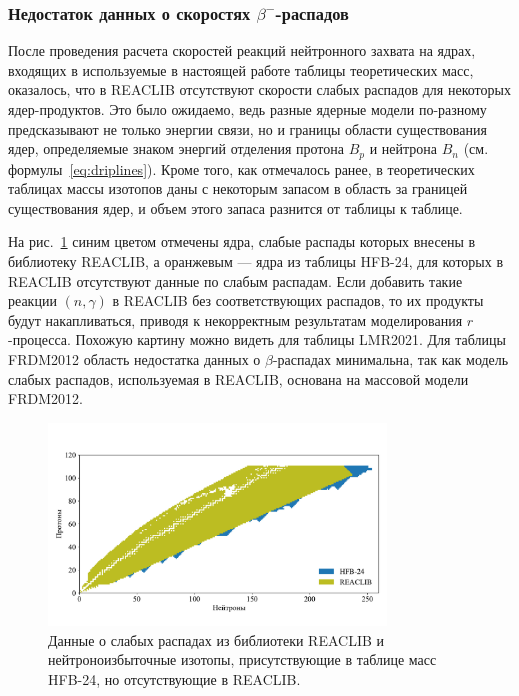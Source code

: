 \subsubsection{Недостаток данных о скоростях $\beta^-$-распадов}
  После проведения расчета скоростей реакций нейтронного захвата на ядрах, входящих в используемые в настоящей работе таблицы теоретических масс, оказалось, что в REACLIB отсутствуют скорости слабых распадов для некоторых ядер-продуктов.  Это было ожидаемо, ведь разные ядерные модели по-разному предсказывают не только энергии связи, но и границы области существования ядер, определяемые знаком энергий отделения протона $B_p$ и нейтрона $B_n$ (см. формулы~\ref{eq:driplines}). Кроме того, как отмечалось ранее, в теоретических таблицах массы изотопов даны с некоторым запасом в область за границей существования ядер, и объем этого запаса разнится от таблицы к таблице. 

  На рис.~\ref{img:weak_comparison} синим цветом отмечены ядра, слабые распады которых внесены в библиотеку REACLIB, а оранжевым --- ядра из таблицы HFB-24, для которых в REACLIB отсутствуют данные по слабым распадам. Если добавить такие реакции $(n,\gamma)$ в REACLIB без соответствующих распадов, то их продукты будут накапливаться, приводя к некорректным результатам моделирования $r$-процесса. Похожую картину можно видеть для таблицы LMR2021. Для таблицы FRDM2012 область недостатка данных о $\beta$-распадах минимальна, так как модель слабых распадов, используемая в REACLIB, основана на массовой модели FRDM2012.
  

\begin{figure}
  \centering
  \includegraphics[width=0.8\textwidth]{pics/hfb_vs_reaclib.pdf}
  \caption{Данные о слабых распадах из библиотеки REACLIB и нейтроноизбыточные изотопы, присутствующие в таблице масс HFB-24, но отсутствующие в REACLIB.}
  \label{img:weak_comparison}
\end{figure}

